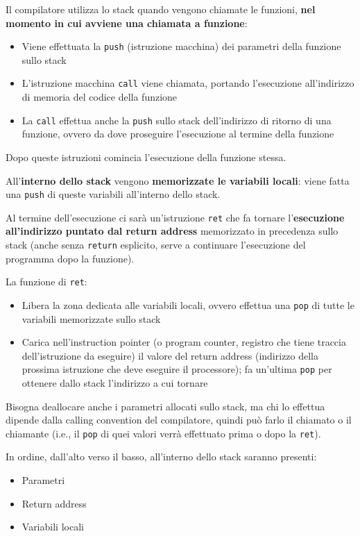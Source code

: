 Il compilatore utilizza lo stack quando vengono chiamate le funzioni, \textbf{nel momento in cui avviene una chiamata a funzione}:
\begin{itemize}
	\item Viene effettuata la \texttt{push} (istruzione macchina) dei parametri della funzione sullo stack
	
    \item L'istruzione macchina \texttt{call} viene chiamata, portando l'esecuzione all'indirizzo di memoria del codice della funzione
	
    \item La \texttt{call} effettua anche la \texttt{push} sullo stack dell'indirizzo di ritorno di una funzione, ovvero da dove proseguire l'esecuzione al termine della funzione 
\end{itemize}

Dopo queste istruzioni comincia l'esecuzione della funzione stessa.

All'\textbf{interno dello stack} vengono \textbf{memorizzate le variabili locali}: viene fatta una \texttt{push} di queste variabili all'interno dello stack.

Al termine dell'esecuzione ci sarà un'istruzione \texttt{ret} che fa tornare l'\textbf{esecuzione all'indirizzo puntato dal return address} memorizzato in precedenza sullo stack (anche senza \texttt{return} esplicito, serve a continuare l'esecuzione del programma dopo la funzione).

La funzione di \texttt{ret}: 
\begin{itemize}
	\item Libera la zona dedicata alle variabili locali, ovvero effettua una \texttt{pop} di tutte le variabili memorizzate sullo stack
    
	\item Carica nell'instruction pointer (o program counter, registro che tiene traccia dell'istruzione da eseguire) il valore del return address (indirizzo della prossima istruzione che deve eseguire il processore); fa un'ultima \texttt{pop} per ottenere dallo stack l'indirizzo a cui tornare
\end{itemize}

Bisogna deallocare anche i parametri allocati sullo stack, ma chi lo effettua dipende dalla calling convention del compilatore, quindi può farlo il chiamato o il chiamante (i.e., il \texttt{pop} di quei valori verrà effettuato prima o dopo la \texttt{ret}).

In ordine, dall'alto verso il basso, all'interno dello stack saranno presenti: 
\begin{itemize}
	\item Parametri 

	\item Return address

	\item Variabili locali
\end{itemize}

